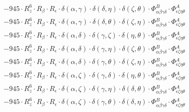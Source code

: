 \documentclass{article}
\begin{document}
\begin{equation}
\begin{array}{c}
 \\[0.2em] 		 - 945 \cdot R_{z}^{6} \cdot R_{\beta{}} \cdot R_{\epsilon{}} \cdot \delta{}\left(\alpha{}, \gamma{}\right) \cdot \delta{}\left(\delta{}, \eta{}\right) \cdot \delta{}\left(\zeta{}, \theta{}\right) \cdot \Phi{}^{B}_{\alpha{}\beta{}\gamma{}\delta{}} \cdot \Phi{}^{A}_{\epsilon{}\zeta{}\eta{}\theta{}} 
 \\[0.2em] 		 - 945 \cdot R_{z}^{6} \cdot R_{\beta{}} \cdot R_{\epsilon{}} \cdot \delta{}\left(\alpha{}, \gamma{}\right) \cdot \delta{}\left(\delta{}, \theta{}\right) \cdot \delta{}\left(\zeta{}, \eta{}\right) \cdot \Phi{}^{B}_{\alpha{}\beta{}\gamma{}\delta{}} \cdot \Phi{}^{A}_{\epsilon{}\zeta{}\eta{}\theta{}} 
 \\[0.2em] 		 - 945 \cdot R_{z}^{6} \cdot R_{\beta{}} \cdot R_{\epsilon{}} \cdot \delta{}\left(\alpha{}, \delta{}\right) \cdot \delta{}\left(\gamma{}, \zeta{}\right) \cdot \delta{}\left(\eta{}, \theta{}\right) \cdot \Phi{}^{B}_{\alpha{}\beta{}\gamma{}\delta{}} \cdot \Phi{}^{A}_{\epsilon{}\zeta{}\eta{}\theta{}} 
 \\[0.2em] 		 - 945 \cdot R_{z}^{6} \cdot R_{\beta{}} \cdot R_{\epsilon{}} \cdot \delta{}\left(\alpha{}, \delta{}\right) \cdot \delta{}\left(\gamma{}, \eta{}\right) \cdot \delta{}\left(\zeta{}, \theta{}\right) \cdot \Phi{}^{B}_{\alpha{}\beta{}\gamma{}\delta{}} \cdot \Phi{}^{A}_{\epsilon{}\zeta{}\eta{}\theta{}} 
 \\[0.2em] 		 - 945 \cdot R_{z}^{6} \cdot R_{\beta{}} \cdot R_{\epsilon{}} \cdot \delta{}\left(\alpha{}, \delta{}\right) \cdot \delta{}\left(\gamma{}, \theta{}\right) \cdot \delta{}\left(\zeta{}, \eta{}\right) \cdot \Phi{}^{B}_{\alpha{}\beta{}\gamma{}\delta{}} \cdot \Phi{}^{A}_{\epsilon{}\zeta{}\eta{}\theta{}} 
 \\[0.2em] 		 - 945 \cdot R_{z}^{6} \cdot R_{\beta{}} \cdot R_{\epsilon{}} \cdot \delta{}\left(\alpha{}, \zeta{}\right) \cdot \delta{}\left(\gamma{}, \delta{}\right) \cdot \delta{}\left(\eta{}, \theta{}\right) \cdot \Phi{}^{B}_{\alpha{}\beta{}\gamma{}\delta{}} \cdot \Phi{}^{A}_{\epsilon{}\zeta{}\eta{}\theta{}} 
 \\[0.2em] 		 - 945 \cdot R_{z}^{6} \cdot R_{\beta{}} \cdot R_{\epsilon{}} \cdot \delta{}\left(\alpha{}, \zeta{}\right) \cdot \delta{}\left(\gamma{}, \eta{}\right) \cdot \delta{}\left(\delta{}, \theta{}\right) \cdot \Phi{}^{B}_{\alpha{}\beta{}\gamma{}\delta{}} \cdot \Phi{}^{A}_{\epsilon{}\zeta{}\eta{}\theta{}} 
 \\[0.2em] 		 - 945 \cdot R_{z}^{6} \cdot R_{\beta{}} \cdot R_{\epsilon{}} \cdot \delta{}\left(\alpha{}, \zeta{}\right) \cdot \delta{}\left(\gamma{}, \theta{}\right) \cdot \delta{}\left(\delta{}, \eta{}\right) \cdot \Phi{}^{B}_{\alpha{}\beta{}\gamma{}\delta{}} \cdot \Phi{}^{A}_{\epsilon{}\zeta{}\eta{}\theta{}} 

\end{array}
\end{equation}
\end{document}

